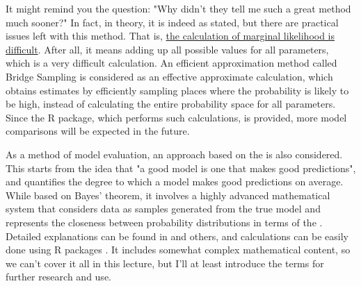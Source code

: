 \documentclass{ltjsbook}
\begin{document}
It might remind you the question: "Why didn't they tell me such a great method much sooner?" In fact, in theory, it is indeed as stated, but there are practical issues left with this method. That is, \underline{the calculation of marginal likelihood is difficult}. After all, it means adding up all possible values for all parameters, which is a very difficult calculation. An efficient approximation method called Bridge Sampling is considered as an effective approximate calculation, which obtains estimates by efficiently sampling places where the probability is likely to be high, instead of calculating the entire probability space for all parameters. Since the R package, which performs such calculations, is provided, more model comparisons will be expected in the future.

As a method of model evaluation, an approach based on the  is also considered. This starts from the idea that "a good model is one that makes good predictions", and quantifies the degree to which a model makes good predictions on average. While based on Bayes' theorem, it involves a highly advanced mathematical system that considers data as samples generated from the true model and represents the closeness between probability distributions in terms of the . Detailed explanations can be found in \textcite{Hamada201912} and others, and calculations can be easily done using R packages \parencite{loo}. It includes somewhat complex mathematical content, so we can't cover it all in this lecture, but I'll at least introduce the terms for further research and use.
\end{document}
